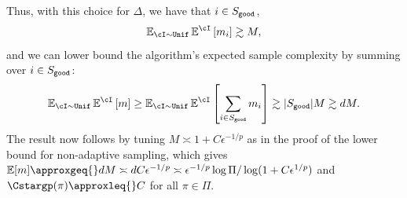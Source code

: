 Thus, with this choice for $\Delta$, we have that $i \in S_{\texttt{good}}$,
\begin{align}
  \EnI\Enki\left[ m_i\right] \gtrsim M,
\end{align}
and we can lower bound the algorithm's expected sample complexity by
summing over $i\in S_{\texttt{good}}$:
\begin{align}
    \EnI\Enki\left[ m\right] \ge   \EnI\Enki\left[ \sum_{i\in \Sgood} m_i\right] \gtrsim |\Sgood|M \gtrsim dM.
\end{align}
The result now follows by tuning $M \asymp 1+ C \epsilon^{-1/p}$ as in
the proof of the lower bound for non-adaptive sampling, which gives
$\En\brk{m}\approxgeq{}dM \asymp dC\epsilon^{-1/p} \asymp \epsilon^{-1/p}
\log \Pi/\log(1+ C \epsilon^{1/p})$ and $\Cstargp(\pi)\approxleq{}C$
for all $\pi\in\Pi$.\loose



